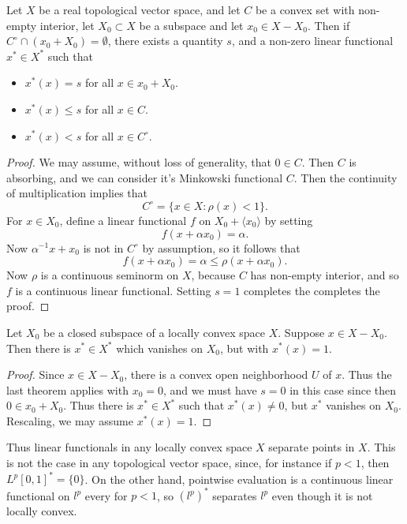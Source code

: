 \begin{theorem}
    Let $X$ be a real topological vector space, and let $C$ be a convex set with non-empty interior, let $X_0 \subset X$ be a subspace and let $x_0 \in X - X_0$. Then if $C^\circ \cap (x_0 + X_0) = \emptyset$, there exists a quantity $s$, and a non-zero linear functional $x^* \in X^*$ such that
    \begin{itemize}
        \item $x^*(x) = s$ for all $x \in x_0 + X_0$.
        \item $x^*(x) \leq s$ for all $x \in C$.
        \item $x^*(x) < s$ for all $x \in C^\circ$.
    \end{itemize}
\end{theorem}
\begin{proof}
    We may assume, without loss of generality, that $0 \in C$. Then $C$ is absorbing, and we can consider it's Minkowski functional $C$. Then the continuity of multiplication implies that
    \[ C^\circ = \{ x \in X: \rho(x) < 1 \}. \]
    For $x \in X_0$, define a linear functional $f$ on $X_0 + \langle x_0 \rangle$ by setting
    \[ f(x + \alpha x_0) = \alpha. \]
    Now $\alpha^{-1} x + x_0$ is not in $C^\circ$ by assumption, so it follows that
    \[ f(x + \alpha x_0) = \alpha \leq \rho(x + \alpha x_0). \]
    Now $\rho$ is a continuous seminorm on $X$, because $C$ has non-empty interior, and so $f$ is a continuous linear functional. Setting $s = 1$ completes the completes the proof.
\end{proof}

\begin{corollary}
    Let $X_0$ be a closed subspace of a locally convex space $X$. Suppose $x \in X - X_0$. Then there is $x^* \in X^*$ which vanishes on $X_0$, but with $x^*(x) = 1$.
\end{corollary}
\begin{proof}
    Since $x \in X - X_0$, there is a convex open neighborhood $U$ of $x$. Thus the last theorem applies with $x_0 = 0$, and we must have $s = 0$ in this case since then $0 \in x_0 + X_0$. Thus there is $x^* \in X^*$ such that $x^*(x) \neq 0$, but $x^*$ vanishes on $X_0$. Rescaling, we may assume $x^*(x) = 1$.
\end{proof}

Thus linear functionals in any locally convex space $X$ separate points in $X$. This is not the case in any topological vector space, since, for instance if $p < 1$, then $L^p[0,1]^* = \{ 0 \}$. On the other hand, pointwise evaluation is a continuous linear functional on $l^p$ every for $p < 1$, so $(l^p)^*$ separates $l^p$ even though it is not locally convex.

